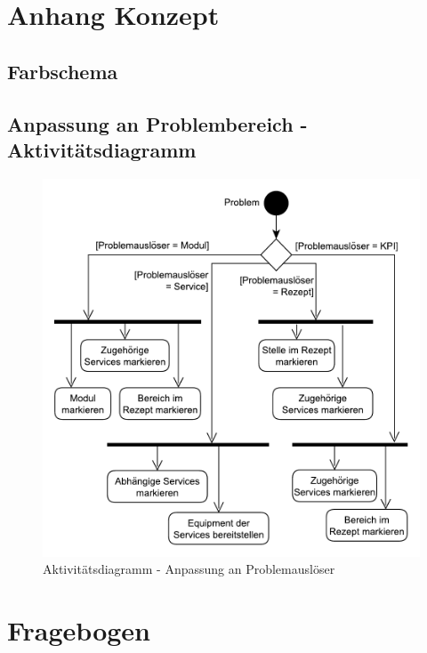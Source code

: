 
\chapter{Anhang Konzept}
\section{Farbschema}

\section{Anpassung an Problembereich - Aktivitätsdiagramm}
\begin{figure}[htbp]
\centering
\includegraphics[scale=0.6]{DA_files/UML/Anhang/Aktivitaetsdiagramm-Problem.pdf}
\caption{Aktivitätsdiagramm - Anpassung an Problemauslöser}
\end{figure}

\chapter{Fragebogen}
\label{A:Fragebogen-Validierung}

